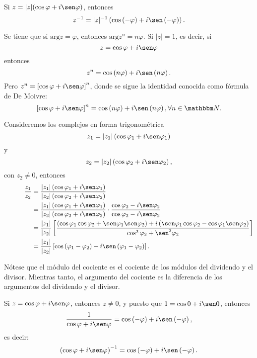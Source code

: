 \begin{corollary}
    Si $z=|z| (\cos \varphi +i \sen \varphi )$, entonces
    $$z^{-1}=|z|^{-1} \left(\cos \left(-\varphi \right)+i \sen \left( -\varphi \right) \right).$$
\end{corollary}

Se tiene que si $\textrm{arg}  z=\varphi$, entonces $\textrm{arg}  z^n=n\varphi$. Si $|z|=1$, es decir, si
$$z=\cos \varphi +i \sen \varphi$$
entonces
$$z^n=\cos \left( n \varphi \right)+i \sen \left( n\varphi \right).$$
Pero $z^n=\left[ \cos \varphi +i \sen \varphi \right]^n$, donde se sigue la identidad conocida como fórmula de De Moivre:
$$\left[ \cos \varphi +i \sen \varphi \right]^n= \cos \left( n\varphi \right) +i \sen \left( n \varphi \right),  \forall n \in \NN.$$

Consideremos los complejos en forma trigonométrica
$$z_1=|z_1| \left( \cos \varphi _1+i \sen \varphi _1 \right)$$
y
$$z_2=|z_2| \left( \cos \varphi _2+i \sen \varphi _2 \right),$$
con $z_2 \neq 0$, entonces
\begin{align*}
    \quad\quad\quad\frac{z_1}{z_2} &= \frac{|z_1| \left( \cos \varphi _1 +i \sen \varphi _1 \right)}{|z_2| \left( \cos \varphi _2 +i \sen \varphi _2 \right)} \\
    &=\frac{|z_1| \left( \cos \varphi _1 +i \sen \varphi _1 \right)}{|z_2| \left( \cos \varphi _2 +i \sen \varphi _2 \right)} \cdot \frac{\cos \varphi _2 - i \sen \varphi _2}{\cos \varphi _2 -i \sen \varphi _2} \\
    &= \frac{|z_1|}{|z_2|} \left[ \frac{ \left( \cos \varphi _1 \cos \varphi _2 + \sen \varphi _1 \sen \varphi _2 \right) + i \left( \sen \varphi _1 \cos \varphi _2 - \cos \varphi _1 \sen \varphi _2 \right)}{\cos ^2 \varphi _2 + \sen ^2 \varphi _2} \right] \\
    &= \frac{|z_1|}{|z_2|} \left[ \cos \left( \varphi _1 - \varphi _2 \right) + i \sen \left( \varphi _1 - \varphi _2 \right) \right].
\end{align*}

Nótese que el módulo del cociente es el cociente de los módulos del dividendo y el divisor. Mientras tanto, el argumento del cociente es la diferencia de los argumentos del dividendo y el divisor.

Si $z=\cos \varphi +i \sen \varphi $, entonces $z \neq 0$, y puesto que $1=\cos 0 +i \sen 0$, entonces
$$\frac{1}{\cos \varphi +i \sen \varphi} = \cos \left( - \varphi \right)+i \sen \left( -\varphi \right),$$
es decir:
$$\left( \cos \varphi +i \sen \varphi \right)^{-1}=\cos \left( - \varphi \right)+i \sen \left( -\varphi \right).$$

